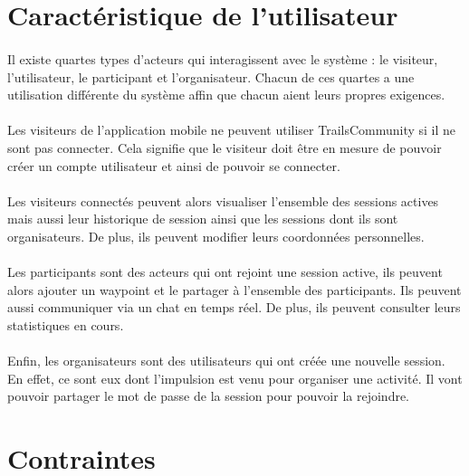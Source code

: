 \documentclass[titlepage, 12pt]{report}
\begin{document}
\section{Caractéristique de l'utilisateur}

\paragraph{}Il existe quartes types d'acteurs qui interagissent avec le système : le visiteur, l'utilisateur, le participant et l'organisateur. Chacun de ces quartes a une utilisation différente du système affin que chacun aient leurs propres exigences.

\paragraph{}Les visiteurs de l'application mobile ne peuvent utiliser TrailsCommunity si il ne sont pas connecter. Cela signifie que le visiteur doit être en mesure de pouvoir créer un compte utilisateur et ainsi de pouvoir se connecter.

\paragraph{}Les visiteurs connectés peuvent alors visualiser l'ensemble des sessions actives mais aussi leur historique de session ainsi que les sessions dont ils sont organisateurs.
De plus, ils peuvent modifier leurs coordonnées personnelles.

\paragraph{}Les participants sont des acteurs qui ont rejoint une session active, ils peuvent alors ajouter un waypoint et le partager à l'ensemble des participants. Ils peuvent aussi communiquer via un chat en temps réel. De plus, ils peuvent consulter leurs statistiques en cours.

\paragraph{}Enfin, les organisateurs sont des utilisateurs qui ont créée une nouvelle session. En effet, ce sont eux dont l'impulsion est venu pour organiser une activité. Il vont pouvoir partager le mot de passe de la session pour pouvoir la rejoindre.

\section{Contraintes}
\end{document}
